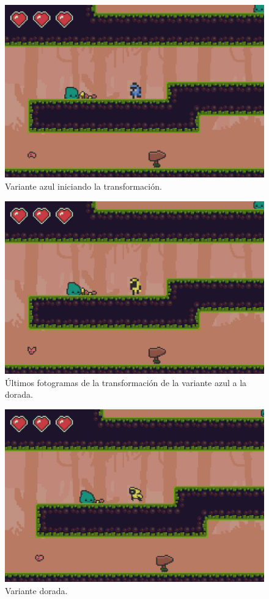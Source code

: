 \begin{figure}[h]
	\centering
	\includegraphics[width=.6\textwidth]{capitulos/apendice/sprites_2.png}
	\caption{Variante azul iniciando la transformación.}\label{fig:ap_sprites_2}
\end{figure}

\begin{figure}[h]
	\centering
	\includegraphics[width=.6\textwidth]{capitulos/apendice/sprites_3.png}
	\caption{Últimos fotogramas de la transformación de la variante azul a la dorada.}\label{fig:ap_sprites_3}
\end{figure}

\begin{figure}[h]
	\centering
	\includegraphics[width=.6\textwidth]{capitulos/apendice/sprites_4.png}
	\caption{Variante dorada.}\label{fig:ap_sprites_4}
\end{figure}

